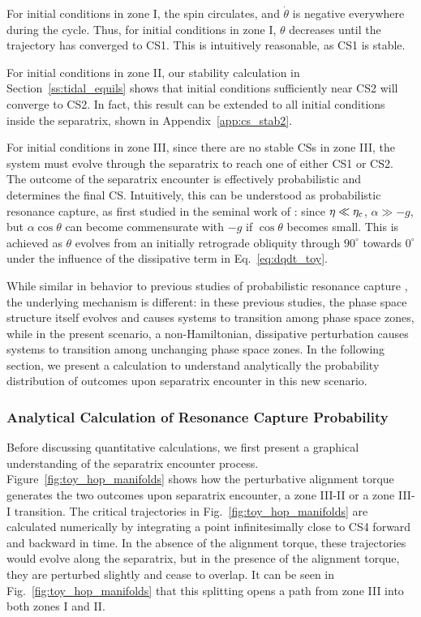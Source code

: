 \documentclass[
        fleqn,
        usenatbib,
    ]{mnras}
\begin{document}
For initial conditions in zone I, the spin circulates, and $\dot{\theta}$ is
negative everywhere during the cycle. Thus, for initial conditions in zone I,
$\theta$ decreases until the trajectory has converged to CS1. This is
intuitively reasonable, as CS1 is stable.

For initial conditions in zone II, our stability calculation in
Section~\ref{ss:tidal_equils} shows that initial conditions sufficiently near CS2
will converge to CS2. In fact, this result can be extended to all initial
conditions inside the separatrix, shown in Appendix~\ref{app:cs_stab2}.

For initial conditions in zone III, since there are no stable CSs in zone III,
the system must evolve through the separatrix to reach one of either CS1 or CS2.
The outcome of the separatrix encounter is effectively probabilistic and
determines the final CS\@. Intuitively, this can be understood as probabilistic
resonance capture, as first studied in the seminal work of \citet{henrard1982}:
since $\eta \ll \eta_{\rm c}$, $\alpha \gg -g$, but $\alpha \cos \theta$ can
become commensurate with $-g$ if $\cos \theta$ becomes small. This is achieved
as $\theta$ evolves from an initially retrograde obliquity through $90^\circ$
towards $0^\circ$ under the influence of the dissipative term in
Eq.~\eqref{eq:dqdt_toy}.

While similar in behavior to previous studies of probabilistic resonance capture
\citep{henrard1982, su2020}, the underlying mechanism is different: in these
previous studies, the phase space structure itself evolves and causes systems to
transition among phase space zones, while in the present scenario, a
non-Hamiltonian, dissipative perturbation causes systems to transition among
unchanging phase space zones. In the following section, we present a calculation
to understand analytically the probability distribution of outcomes upon
separatrix encounter in this new scenario.

\subsubsection{Analytical Calculation of Resonance Capture Probability}

Before discussing quantitative calculations, we first present a graphical
understanding of the separatrix encounter process.
Figure~\ref{fig:toy_hop_manifolds} shows how the perturbative alignment torque
generates the two outcomes upon separatrix encounter, a zone III-II or a zone
III-I transition. The critical trajectories in Fig.~\ref{fig:toy_hop_manifolds}
are calculated numerically by integrating a point infinitesimally close to CS4
forward and backward in time. In the absence of the alignment torque, these
trajectories would evolve along the separatrix, but in the presence of the
alignment torque, they are perturbed slightly and cease to overlap. It can be
seen in Fig.~\ref{fig:toy_hop_manifolds} that this splitting opens a path from
zone III into both zones I and II\@.
\end{document}
